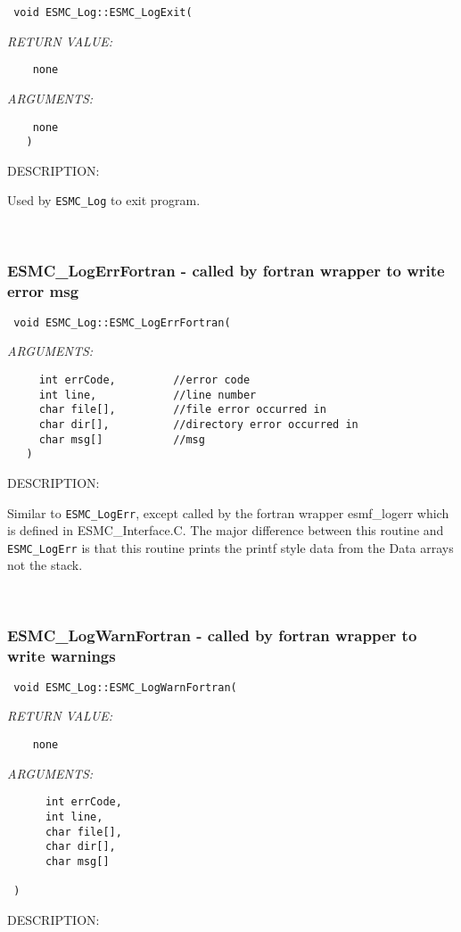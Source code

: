   
\begin{verbatim} void ESMC_Log::ESMC_LogExit(\end{verbatim}{\em RETURN VALUE:}
\begin{verbatim}    none\end{verbatim}{\em ARGUMENTS:}
\begin{verbatim}    none
   )\end{verbatim}
{\sf DESCRIPTION:\\ }


   Used by {\tt ESMC\_Log} to exit program.
   
 
\mbox{}\hrulefill\ 
 

  \subsubsection [ESMC\_LogErrFortran] {ESMC\_LogErrFortran - called by fortran wrapper to write error msg}


  
\begin{verbatim} 
 void ESMC_Log::ESMC_LogErrFortran(
 \end{verbatim}{\em ARGUMENTS:}
\begin{verbatim} 
     int errCode,         //error code
     int line,            //line number
     char file[],         //file error occurred in
     char dir[],          //directory error occurred in
     char msg[]           //msg
   )\end{verbatim}
{\sf DESCRIPTION:\\ }


  Similar to {\tt ESMC\_LogErr}, except called by the fortran wrapper
  esmf\_logerr which is defined in
  ESMC\_Interface.C.  The major difference between this routine
  and {\tt ESMC\_LogErr} is that this
  routine prints the printf style data from the Data arrays not the stack. 
 
\mbox{}\hrulefill\ 
 
\subsubsection [ESMC\_LogWarnFortran] {ESMC\_LogWarnFortran - called by fortran wrapper to write warnings}


  
\begin{verbatim} 
 void ESMC_Log::ESMC_LogWarnFortran(\end{verbatim}{\em RETURN VALUE:}
\begin{verbatim}    none\end{verbatim}{\em ARGUMENTS:}
\begin{verbatim} 
      int errCode,
      int line,
      char file[],
      char dir[],
      char msg[]
 
 )\end{verbatim}
{\sf DESCRIPTION:\\ }


